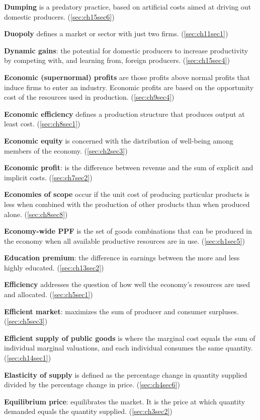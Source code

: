 \textbf{Dumping} is a predatory practice, based on artificial costs aimed at driving out domestic producers. (\ref{sec:ch15sec6})

\textbf{Duopoly} defines a market or sector with just two firms. (\ref{sec:ch11sec1})

\textbf{Dynamic gains}: the potential for domestic producers to increase productivity by competing with, and learning from, foreign producers. (\ref{sec:ch15sec4})

\textbf{Economic (supernormal) profits} are those profits above normal profits that induce firms to enter an industry. Economic profits are based on the opportunity cost of the resources used in production. (\ref{sec:ch9sec4})

\textbf{Economic efficiency} defines a production structure that produces output at least cost. (\ref{sec:ch8sec1})

\textbf{Economic equity} is concerned with the distribution of well-being among members of the economy. (\ref{sec:ch2sec3})

\textbf{Economic profit}: is the difference between revenue and the sum of explicit and implicit costs. (\ref{sec:ch7sec2})

\textbf{Economies of scope} occur if the unit cost of producing particular products is less when combined with the production of other products than when produced alone. (\ref{sec:ch8sec8})

\textbf{Economy-wide PPF} is the set of goods combinations that can be produced in the economy when all available productive resources are in use. (\ref{sec:ch1sec5})

\textbf{Education premium}: the difference in earnings between the more and less highly educated. (\ref{sec:ch13sec2})

\textbf{Efficiency} addresses the question of how well the economy's resources are used and allocated. (\ref{sec:ch5sec1})

\textbf{Efficient market}: maximizes the sum of producer and consumer surpluses. (\ref{sec:ch5sec3})

\textbf{Efficient supply of public goods} is where the marginal cost equals the sum of individual marginal valuations, and each individual consumes the same quantity. (\ref{sec:ch14sec1})

\textbf{Elasticity of supply} is defined as the percentage change in quantity supplied divided by the percentage change in price. (\ref{sec:ch4sec6})

\textbf{Equilibrium price}: equilibrates the market. It is the price at which quantity demanded equals the quantity supplied. (\ref{sec:ch3sec2})

